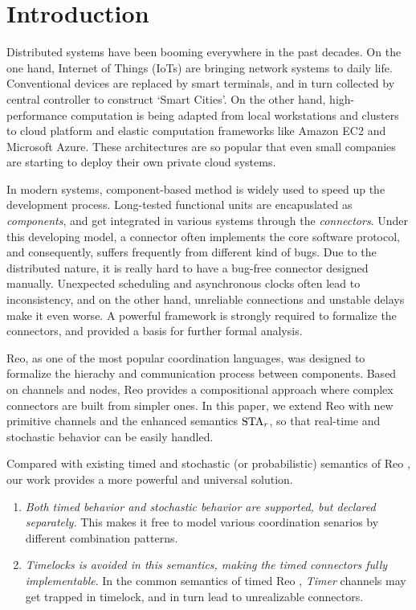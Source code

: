 \section{Introduction}
\label{sec:intro}

Distributed systems have been booming everywhere in the past decades. On the one hand, Internet of Things (IoTs) are bringing network systems to daily life. Conventional devices are replaced by smart terminals, and in turn collected by central controller to construct `Smart Cities'. On the other hand, high-performance computation is being adapted from local workstations and clusters to cloud platform and elastic computation frameworks like Amazon EC2\cite{Newcombe2015} and Microsoft Azure\cite{Li2009}. These architectures are so popular that even small companies are starting to deploy their own private cloud systems. 

In modern systems, component-based method is widely used to speed up the development process. Long-tested functional units are encapuslated as \emph{components}, and get integrated in various systems through the \emph{connectors}. Under this developing model, a connector often implements the core software protocol, and consequently, suffers frequently from different kind of bugs.
Due to the distributed nature, it is really hard to have a bug-free connector designed manually. Unexpected scheduling and asynchronous clocks often lead to inconsistency, and on the other hand, unreliable connections and unstable delays make it even worse. A powerful framework is strongly required to formalize the connectors, and provided a basis for further formal analysis.

Reo\cite{ARBAB2004}, as one of the most popular coordination languages, was designed to formalize the hierachy and communication process between components. Based on channels and nodes, Reo provides a compositional approach where complex connectors are built from simpler ones.
In this paper, we extend Reo with new primitive channels and the enhanced semantics $\mbox{STA}_r$, so that real-time and stochastic behavior can be easily handled.

Compared with existing timed and stochastic (or probabilistic) semantics of Reo \cite{Arbab2009,Baier2006,Meng2012,Meng2007}, our work provides a more powerful and universal solution. 
\begin{enumerate}
    \item \emph{Both timed behavior and stochastic behavior are supported, but declared separately.} This makes it free to model various coordination senarios by different combination patterns.
    \item \emph{Timelocks is avoided in this semantics, making the timed connectors fully implementable}. In the common semantics of timed Reo \cite{Arbab2006,Meng2012}, \emph{Timer} channels may get trapped in timelock, and in turn lead to unrealizable connectors.
\end{enumerate}

